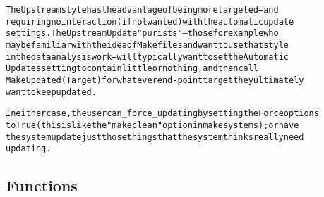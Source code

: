 \begin{alltt}
The Upstream style has the advantage of being more targeted -- and 
requiring no interaction (if not wanted) with the automatic update 
settings.   The Upstream Update "purists" -- those for example who 
may be familiar with the idea of Makefiles and want to use that style
in the data analysis work -- will typically want to set the Automatic 
Updates setting to contain little or nothing, and then call 
MakeUpdated(Target) for whatever end-point target they ultimately 
want to keep updated. 

In either case, the user can \_force\_ updating by setting the Force options
to True (this is like the "make clean" option in make systems); or have
the system update just those things that the system thinks really need 
updating.   
\end{alltt}



  \subsection{Functions}

    \label{System:Update:MakeUpdated}

    \vspace{0.5ex}

